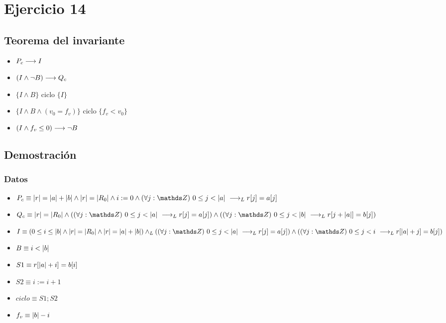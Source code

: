 \documentclass{article}
\begin{document}
\section*{Ejercicio 14}

\subsection*{Teorema del invariante}
\begin{itemize}
    \item $P_{c} \longrightarrow I$
    \item $(I \wedge \neg B) \longrightarrow Q_{c}$
    \item $\{I \wedge B\}$ ciclo $\{ I \}$
    \item $\{I \wedge B \wedge (v_{0} = f_{v})\}$ ciclo $\{f_{v} < v_{0}\}$
    \item $(I \wedge f_{v} \leq 0) \longrightarrow \neg B$
\end{itemize}

\subsection*{Demostración}

\subsubsection*{Datos}
\begin{itemize}
    \item $P_{c}    \equiv \longitud{r} = \longitud{a} + \longitud{b} \wedge \longitud{r} = \longitud{R_{0}} \wedge i:= 0 \wedge \paraTodo{j}{0}{\longitud{a}} \implicaLuego r[j]=a[j]$
    \item $Q_{c}    \equiv \longitud{r} = \longitud{R_{0}} \wedge (\paraTodo{j}{0}{\longitud{a}} \implicaLuego r[j] = a[j]) \wedge (\paraTodo{j}{0}{\longitud{b}} \implicaLuego r[j+\longitud{a}] = b[j])$
    \item $I        \equiv (0 \leq i \leq \longitud{b} \wedge \longitud{r} = \longitud{R_{0}} \wedge \longitud{r} = \longitud{a} + \longitud{b}) \yLuego (\paraTodo{j}{0}{\longitud{a}} \implicaLuego r[j] = a[j]) \wedge (\paraTodo{j}{0}{i} \implicaLuego r[\longitud{a}+j]=b[j])$
    \item $B        \equiv i < |b|$
    \item $S1       \equiv r[|a|+i] = b[i]$
    \item $S2       \equiv i:= i + 1$
    \item $ciclo    \equiv S1;S2$
    \item $f_{v}    \equiv |b| - i$
\end{itemize}
\end{document}
